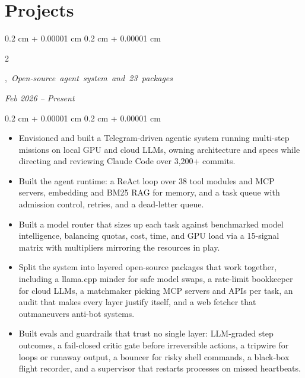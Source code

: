 \documentclass[10pt, letterpaper]{article}
\newenvironment{highlights}{
    \begin{itemize}[
        topsep=0.10 cm,
        parsep=0.10 cm,
        partopsep=0pt,
        itemsep=0pt,
        leftmargin=0.4 cm + 10pt
    ]
}{
    \end{itemize}
} %
\newenvironment{onecolentry}{
    \begin{adjustwidth}{
        0.2 cm + 0.00001 cm
    }{
        0.2 cm + 0.00001 cm
    }
}{
    \end{adjustwidth}
} %
\newenvironment{twocolentry}[2][]{
    \onecolentry
    \def\secondColumn{#2}
    \setcolumnwidth{\fill, 4.5 cm}
    \begin{paracol}{2}
}{
    \switchcolumn \raggedleft \secondColumn
    \end{paracol}
    \endonecolentry
} %
\let\hrefWithoutArrow\href
\renewcommand{\href}[2]{\hrefWithoutArrow{#1}{\ifthenelse{\equal{#2}{}}{ }{#2 }\raisebox{.15ex}{\footnotesize \faExternalLink*}}}
\begin{document}
    \section{Projects}

        \begin{twocolentry}{
        \textit{Feb 2026 – Present}}
            \mbox{\href{https://github.com/msakirc/kutai}{\textbf{KutAI}},
            \textit{Open-source agent system and 23 packages}
            }
        \end{twocolentry}

        \vspace{0.10 cm}
        \begin{onecolentry}
            \begin{highlights}
            \item Envisioned and built a Telegram-driven agentic system running multi-step missions on local GPU and cloud LLMs, owning architecture and specs while directing and reviewing Claude Code over 3,200+ commits.
            \item Built the agent runtime: a ReAct loop over 38 tool modules and MCP servers, embedding and BM25 RAG for memory, and a task queue with admission control, retries, and a dead-letter queue.
            \item Built a model router that sizes up each task against benchmarked model intelligence, balancing quotas, cost, time, and GPU load via a 15-signal matrix with multipliers mirroring the resources in play.
            \item Split the system into layered open-source packages that work together, including a llama.cpp minder for safe model swaps, a rate-limit bookkeeper for cloud LLMs, a matchmaker picking MCP servers and APIs per task, an audit that makes every layer justify itself, and a web fetcher that outmaneuvers anti-bot systems.
            \item Built evals and guardrails that trust no single layer: LLM-graded step outcomes, a fail-closed critic gate before irreversible actions, a tripwire for loops or runaway output, a bouncer for risky shell commands, a black-box flight recorder, and a supervisor that restarts processes on missed heartbeats.
            \end{highlights}
        \end{onecolentry}


\end{document}
